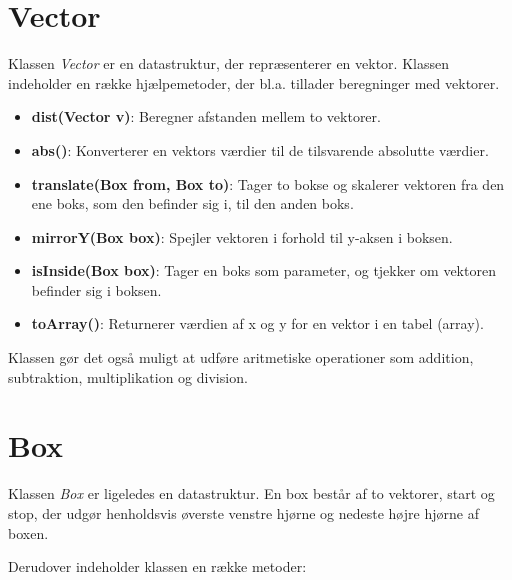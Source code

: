 \section{Vector}

Klassen \emph{Vector} er en datastruktur, der repræsenterer en vektor. Klassen indeholder en række hjælpemetoder, der bl.a. tillader beregninger med vektorer.

\begin{itemize}
	\item \textbf{dist(Vector v)}: Beregner afstanden mellem to vektorer.
	\item \textbf{abs()}: Konverterer en vektors værdier til de tilsvarende absolutte værdier.
	\item \textbf{translate(Box from, Box to)}: Tager to bokse og skalerer vektoren fra den ene boks, som den befinder sig i, til den anden boks.
	\item \textbf{mirrorY(Box box)}: Spejler vektoren i forhold til y-aksen i boksen.
	\item \textbf{isInside(Box box)}: Tager en boks som parameter, og tjekker om vektoren befinder sig i boksen.
	\item \textbf{toArray()}: Returnerer værdien af x og y for en vektor i en tabel (array).
\end{itemize}

Klassen gør det også muligt at udføre aritmetiske operationer som addition, subtraktion, multiplikation og division. 

\section{Box}

Klassen \emph{Box} er ligeledes en datastruktur. En box består af to vektorer, start og stop, der udgør henholdsvis øverste venstre hjørne og nedeste højre hjørne af boxen.

Derudover indeholder klassen en række metoder:

